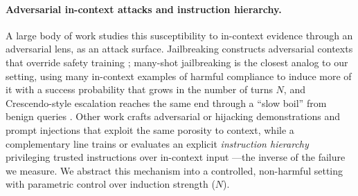 \paragraph{Adversarial in-context attacks and instruction hierarchy.}
A large body of work studies this susceptibility to in-context evidence through an adversarial lens, as an attack surface. Jailbreaking constructs adversarial contexts that override safety training \citep{zou2023universaltransferableadversarialattacks, wei2023jailbrokendoesllmsafety}; many-shot jailbreaking \citep{anil_many-shot_2024} is the closest analog to our setting, using many in-context examples of harmful compliance to induce more of it with a success probability that grows in the number of turns $N$, and Crescendo-style escalation reaches the same end through a ``slow boil'' from benign queries \citep{russinovich2025great}. Other work crafts adversarial or hijacking demonstrations \citep{wangAdversarialDemonstrationAttacks2023, zhouHijackingLargeLanguage2023} and prompt injections \citep{perezIgnorePreviousPrompt2022} that exploit the same porosity to context, while a complementary line trains or evaluates an explicit \emph{instruction hierarchy} privileging trusted instructions over in-context input \citep{wallaceInstructionHierarchy2024, muCanLLMsFollow2023, zverevCANLLMSSEPARATE2025}---the inverse of the failure we measure. We abstract this mechanism into a controlled, non-harmful setting with parametric control over induction strength ($N$).

